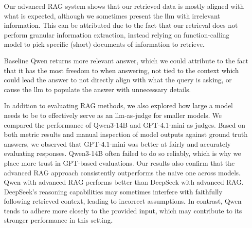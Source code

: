 \documentclass[fleqn,moreauthors,10pt]{ds_report}
\begin{document}
Our advanced RAG system shows that our retrieved data is mostly aligned with what is expected, although we sometimes present the \ac{llm} with irrelevant information. This can be attributed due to the fact that our retrieval does not perform granular information extraction, instead relying on function-calling model to pick specific (short) documents of information to retrieve.

Baseline Qwen returns more relevant answer, which we could attribute to the fact that it has the most freedom to when answering, not tied to the context which could lead the answer to not directly align with what the query is asking, or cause the \ac{llm} to populate the answer with unnecessary details.

In addition to evaluating RAG methods, we also explored how large a model needs to be to effectively serve as an \ac{llm}-as-judge for smaller models. We compared the performance of Qwen3-14B and GPT-4.1-mini as judges. Based on both metric results and manual inspection of model outputs against ground truth answers, we observed that GPT-4.1-mini was better at fairly and accurately evaluating responses. Qwen3-14B often failed to do so reliably, which is why we place more trust in GPT-based evaluations. Our results also confirm that the advanced RAG approach consistently outperforms the naive one across models. Qwen with advanced RAG performs better than DeepSeek with advanced RAG. DeepSeek's reasoning capabilities may sometimes interfere with faithfully following retrieved context, leading to incorrect assumptions. In contrast, Qwen tends to adhere more closely to the provided input, which may contribute to its stronger performance in this setting.




\end{document}
